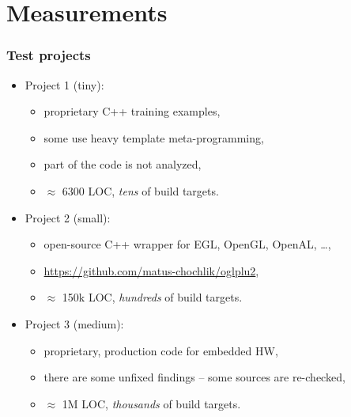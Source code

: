 \documentclass[compress,table,xcolor=table]{beamer}
\begin{document}
\section{Measurements}
\begin{frame}
  \Huge
\end{frame}
\begin{frame}
  \frametitle{Test projects}
    \Large
    \begin{itemize}
    \item Project 1 (tiny):
    \begin{itemize}
    \large
    \item proprietary C++ training examples,
    \item some use {\LARGE heavy} template meta-programming,
    \item part of the code is not analyzed,
    \item {\larger $\approx$ 6300 LOC}, {\em \larger tens} of build targets.
    \end{itemize}
    \item Project 2 (small):
    \begin{itemize}
    \large
    \item open-source C++ wrapper for EGL, OpenGL, OpenAL, \ldots,
    \item \url{https://github.com/matus-chochlik/oglplu2},
    \item {\larger $\approx$ 150k LOC}, {\em \larger hundreds} of build targets.
    \end{itemize}
    \item Project 3 (medium):
    \begin{itemize}
    \large
    \item proprietary, production code for embedded HW,
    \item there are some unfixed findings -- some sources are re-checked,
    \item {\larger $\approx$ 1M LOC}, {\em \larger thousands} of build targets.
    \end{itemize}
    \end{itemize}
\end{frame}
\end{document}
